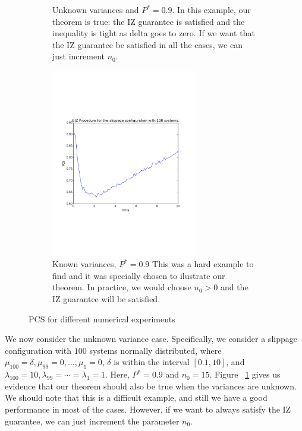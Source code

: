 \documentclass{wscpaperproc}
\theoremstyle{wsc}
\begin{document}
\begin{figure}[h]
\begin{subfigure}[b]{0.4\textwidth}
             \caption{Unknown variances and $P^*=0.9$. In this example, our theorem is true: the IZ guarantee is satisfied and the inequality is tight as delta goes to zero. If we want that the IZ guarantee be 
    satisfied in all the cases, we can just increment $n_{0}$.
    \label{fig: tahi2}}
    \end{subfigure}
        \hfill
    \begin{subfigure}[b]{0.4\textwidth}
        \centering
         \includegraphics[width=0.7\textwidth]{plot1}
    \caption{Known variances, $P^*=0.9$ This was a hard example to find and it was specially chosen to ilustrate our theorem. In practice, we would choose $n_{0}>0$ and the IZ guarantee will be satisfied. \label{fig: tahi}}
    \end{subfigure}
    \caption{PCS for different numerical experiments
\label{fig:tahi10}}

\end{figure}  


We now consider the unknown variance case. Specifically, we consider a slippage configuration 
with $100$ systems normally distributed, where $\mu_{100}=\delta,\mu_{99}=0,\dots,\mu_{1}=0$, $\delta$ is 
within the interval $[0.1,10]$, and $\lambda_{100}=10,\lambda_{99}=\cdots=\lambda_{1}=1$. Here, $P^*=0.9$ and $n_{0}=15$.
Figure ~\ref{fig: tahi2} gives us evidence that our theorem should also be true when the variances are unknown. We should note that
this is a difficult example, and still we have a good performance in most of the cases. However, if we want to always satisfy the IZ guarantee, 
we can just increment the parameter $n_{0}$.
\end{document}
